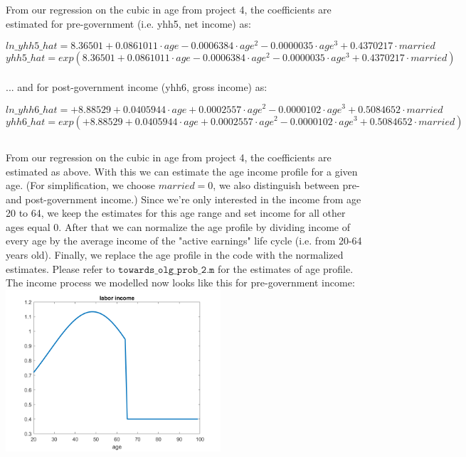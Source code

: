 \documentclass[12pt,a4paper]{article}
\begin{document}
\pagebreak

From our regression on the cubic in age from project 4, the coefficients are estimated for pre-government (i.e. yhh5, net income) as:

\begin{equation*}
    ln\_yhh5\_hat=8.36501+0.0861011\cdot age-0.0006384 \cdot age^2-0.0000035\cdot age^3+0.4370217\cdot married
\end{equation*}
\begin{equation*}
    yhh5\_hat=exp(8.36501+0.0861011\cdot age-0.0006384 \cdot age^2-0.0000035\cdot age^3+0.4370217\cdot married)
\end{equation*}\\

... and for post-government income (yhh6, gross income) as:

\begin{equation*}
    ln\_yhh6\_hat=+8.88529+0.0405944\cdot age+ 0.0002557\cdot age^2-0.0000102\cdot age^3+0.5084652\cdot married
\end{equation*}
\begin{equation*}
    yhh6\_hat=exp(+8.88529+0.0405944\cdot age+ 0.0002557\cdot age^2-0.0000102\cdot age^3+0.5084652\cdot married  )
\end{equation*}

\subsection{}

From our regression on the cubic in age from project 4, the coefficients are estimated as above. With this we can estimate the age income profile for a given age. (For simplification, we choose $married=0$, we also distinguish between pre-and post-government income.) Since we're only interested in the income from age 20 to 64, we keep the estimates for this age range and set income for all other ages equal 0. After that we can normalize the age profile by dividing income of every age by the average income of the "active earnings" life cycle (i.e. from 20-64 years old). Finally, we replace the age profile in the code with the normalized estimates. Please refer to $\texttt{towards\_olg\_prob\_2.m}$ for the estimates of age profile. \\

The income process we modelled now looks like this for pre-government income: \\
\includegraphics[width=0.6\textwidth]{Graphs/labor income.png}
\\
\end{document}
